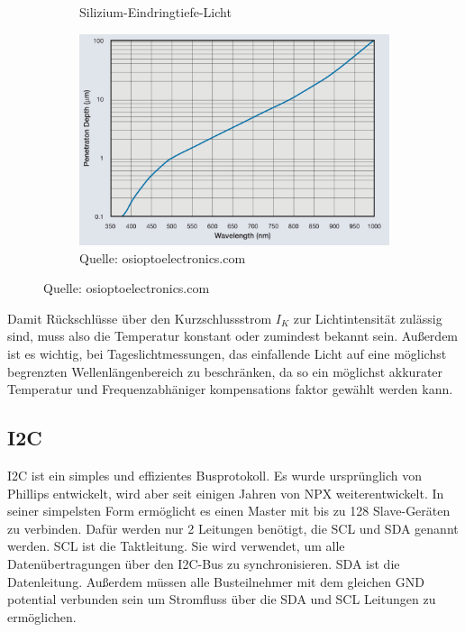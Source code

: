 \begin{figure}[H]
\begin{subfigure}[b]{0.6\textwidth}
    \caption{Silizium-Eindringtiefe-Licht}
    \includegraphics[width=\textwidth]{img/Silizium-Eindringtiefe-Licht.png}
    \caption*{Quelle: osioptoelectronics.com}
  \label{fig:Silizium-eindingtiefe}
  \end{subfigure}
\end{figure}







\noindent Damit Rückschlüsse über den Kurzschlussstrom $I_K$ zur Lichtintensität zulässig sind, muss also die Temperatur konstant oder zumindest bekannt sein.
Außerdem ist es wichtig, bei Tageslichtmessungen, das einfallende Licht auf eine möglichst begrenzten Wellenlängenbereich zu beschränken, da so ein möglichst akkurater Temperatur und Frequenzabhäniger kompensations faktor gewählt werden kann.
\subsection{I2C}
I2C ist ein simples und effizientes Busprotokoll.
Es wurde ursprünglich von Phillips entwickelt, wird aber seit einigen Jahren von NPX weiterentwickelt.
In seiner simpelsten Form ermöglicht es einen Master mit bis zu 128 Slave-Geräten zu verbinden.
Dafür werden nur 2 Leitungen benötigt, die SCL und SDA genannt werden. SCL ist die Taktleitung. Sie wird verwendet, um alle Datenübertragungen über den I2C-Bus zu synchronisieren. SDA ist die Datenleitung.
Außerdem müssen alle Busteilnehmer mit dem gleichen GND potential verbunden sein um Stromfluss über die SDA und SCL Leitungen zu ermöglichen\cite{i2b-bus_org}.\\

